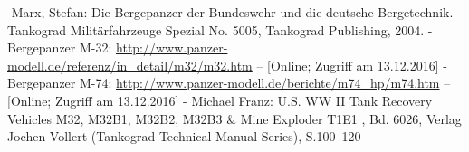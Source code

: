\documentclass[12pt,a4paper]{report}
\begin{document}
\pagebreak

\begin{thebibliography}{999}
\bibitem [Marx] -Marx, Stefan: Die Bergepanzer der Bundeswehr und die deutsche Bergetechnik. Tankograd Militärfahrzeuge Spezial No. 5005, Tankograd Publishing, 2004.
\bibitem [PM] -Bergepanzer M-32: \url{http://www.panzer-modell.de/referenz/in_detail/m32/m32.htm} – [Online; Zugriff am 13.12.2016]
\bibitem [PM] -Bergepanzer M-74: \url{http://www.panzer-modell.de/berichte/m74_hp/m74.htm} – [Online; Zugriff am 13.12.2016] 
\bibitem [MF] - Michael Franz: U.S. WW II Tank Recovery Vehicles M32, M32B1, M32B2, M32B3 \& Mine Exploder T1E1 , Bd. 6026, Verlag Jochen Vollert (Tankograd Technical Manual Series), S.100--120


\end{thebibliography}
\end{document}
